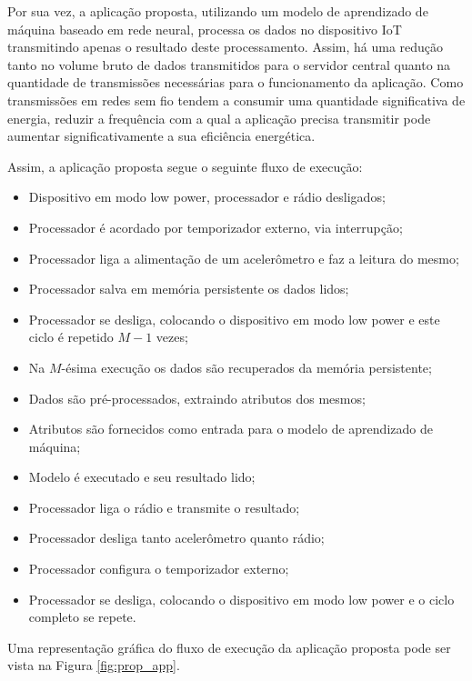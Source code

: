 \documentclass[a5paper]{ufsc-thesis}  %
\begin{document}
Por sua vez, a aplicação proposta, utilizando um modelo de aprendizado de máquina baseado em rede neural, processa os dados no dispositivo IoT transmitindo apenas o resultado deste processamento. Assim, há uma redução tanto no volume bruto de dados transmitidos para o servidor central quanto na quantidade de transmissões necessárias para o funcionamento da aplicação. Como transmissões em redes sem fio tendem a consumir uma quantidade significativa de energia, reduzir a frequência com a qual a aplicação precisa transmitir pode aumentar significativamente a sua eficiência energética.

Assim, a aplicação proposta segue o seguinte fluxo de execução:

\begin{itemize}
    \itemsep-0.5em 
    \item Dispositivo em modo low power, processador e rádio desligados;
    \item Processador é acordado por temporizador externo, via interrupção;
    \item Processador liga a alimentação de um acelerômetro e faz a leitura do mesmo;
    \item Processador salva em memória persistente os dados lidos;
    \item Processador se desliga, colocando o dispositivo em modo low power e este ciclo é repetido $M-1$ vezes;
    \item Na $M$-ésima execução os dados são recuperados da memória persistente;
    \item Dados são pré-processados, extraindo atributos dos mesmos;
    \item Atributos são fornecidos como entrada para o modelo de aprendizado de máquina;
    \item Modelo é executado e seu resultado lido;
    \item Processador liga o rádio e transmite o resultado;
    \item Processador desliga tanto acelerômetro quanto rádio;
    \item Processador configura o temporizador externo;
    \item Processador se desliga, colocando o dispositivo em modo low power e o ciclo completo se repete.
\end{itemize}

Uma representação gráfica do fluxo de execução da aplicação proposta pode ser vista na Figura \ref{fig:prop_app}.
\end{document}
